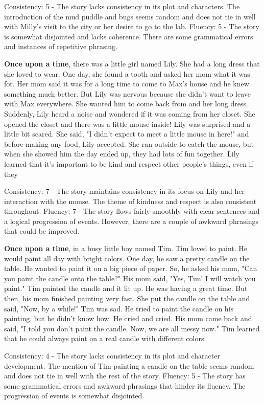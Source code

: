 \documentclass{article}
\begin{document}
Consistency: 5 - The story lacks consistency in its plot and characters. The introduction of the mud puddle and bugs seems random and does not tie in well with Milly's visit to the city or her desire to go to the lab.
Fluency: 5 - The story is somewhat disjointed and lacks coherence. There are some grammatical errors and instances of repetitive phrasing.

\textbf{Once upon a time}, there was a little girl named Lily. She had a long dress that she loved to wear. One day, she found a tooth and asked her mom what it was for. Her mom said it was for a long time to come to Max's house and he knew something much better. But Lily was nervous because she didn't want to leave with Max everywhere. She wanted him to come back from and her long dress. Suddenly, Lily heard a noise and wondered if it was coming from her closet. She opened the closet and there was a little mouse inside! Lily was surprised and a little bit scared. She said, "I didn't expect to meet a little mouse in here!" and before making any food, Lily accepted. She ran outside to catch the mouse, but when she showed him the day ended up, they had lots of fun together. Lily learned that it's important to be kind and respect other people's things, even if they

Consistency: 7 - The story maintains consistency in its focus on Lily and her interaction with the mouse. The theme of kindness and respect is also consistent throughout.
Fluency: 7 - The story flows fairly smoothly with clear sentences and a logical progression of events. However, there are a couple of awkward phrasings that could be improved.

\textbf{Once upon a time}, in a busy little boy named Tim. Tim loved to paint. He would paint all day with bright colors. One day, he saw a pretty candle on the table. He wanted to paint it on a big piece of paper. So, he asked his mom, "Can you paint the candle onto the table?" His mom said, "Yes, Tim! I will watch you paint." Tim painted the candle and it lit up. He was having a great time. But then, his mom finished painting very fast. She put the candle on the table and said, "Now, by a while!" Tim was sad. He tried to paint the candle on his painting, but he didn't know how. He cried and cried. His mom came back and said, "I told you don't paint the candle. Now, we are all messy now." Tim learned that he could always paint on a real candle with different colors.

Consistency: 4 - The story lacks consistency in its plot and character development. The mention of Tim painting a candle on the table seems random and does not tie in well with the rest of the story.
Fluency: 5 - The story has some grammatical errors and awkward phrasings that hinder its fluency. The progression of events is somewhat disjointed.
\end{document}
